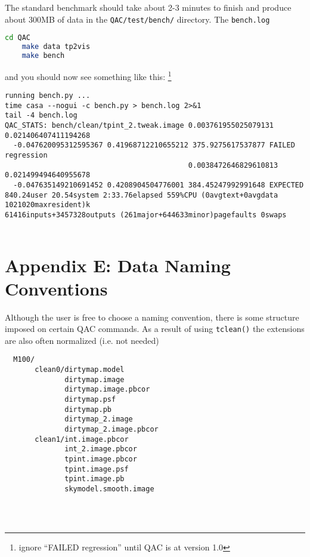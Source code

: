 \documentclass[12pt,a4paper]{article}
\begin{document}
The standard benchmark should take about 2-3 minutes to finish and produce about 300MB of
data in the \verb+QAC/test/bench/+ directory. The \verb+bench.log+

\begin{lstlisting}[language=bash]
    cd QAC
    make data tp2vis
    make bench
\end{lstlisting}

\noindent
and you should now see something like this:
\footnote{ignore ``FAILED regression'' until QAC is at version 1.0}

\footnotesize
\begin{verbatim}
running bench.py ...
time casa --nogui -c bench.py > bench.log 2>&1
tail -4 bench.log
QAC_STATS: bench/clean/tpint_2.tweak.image 0.003761955025079131 0.021406407411194268
  -0.047620095312595367 0.41968712210655212 375.9275617537877 FAILED regression
                                           0.0038472646829610813 0.021499494640955678
  -0.047635149210691452 0.4208904504776001 384.45247992991648 EXPECTED
840.24user 20.54system 2:33.76elapsed 559%CPU (0avgtext+0avgdata 1021020maxresident)k
61416inputs+3457328outputs (261major+644633minor)pagefaults 0swaps


\end{verbatim}
\normalsize


\newpage
\section*{Appendix E: Data Naming Conventions}

Although the user is free to choose a naming convention,
there is some structure imposed on certain QAC commands. As a result of using
\verb+tclean()+ the extensions are also often normalized (i.e. not needed)

\begin{verbatim}
  M100/
       clean0/dirtymap.model
              dirtymap.image
              dirtymap.image.pbcor
              dirtymap.psf
              dirtymap.pb
              dirtymap_2.image
              dirtymap_2.image.pbcor
       clean1/int.image.pbcor
              int_2.image.pbcor
              tpint.image.pbcor
              tpint.image.psf
              tpint.image.pb
              skymodel.smooth.image
             

       
\end{verbatim}
\end{document}
